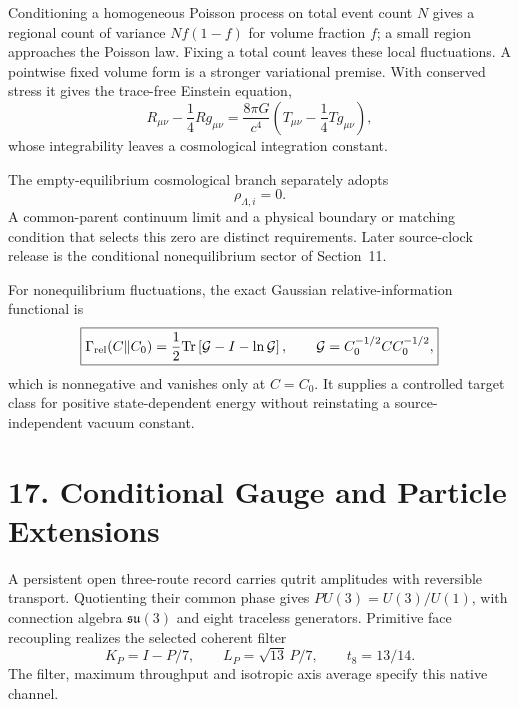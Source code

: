 \documentclass[11pt]{article}
\begin{document}
Conditioning a homogeneous Poisson process on total event count $N$ gives a regional count of variance $Nf(1-f)$ for volume fraction $f$; a small region approaches the Poisson law. Fixing a total count leaves these local fluctuations. A pointwise fixed volume form is a stronger variational premise. With conserved stress it gives the trace-free Einstein equation,
\[
R_{\mu\nu}-\frac14Rg_{\mu\nu}
=\frac{8\pi G}{c^4}\left(T_{\mu\nu}-\frac14Tg_{\mu\nu}\right),
\]
whose integrability leaves a cosmological integration constant.

The empty-equilibrium cosmological branch separately adopts
\[
\boxed{\rho_{\Lambda,i}=0}.
\]
A common-parent continuum limit and a physical boundary or matching condition that selects this zero are distinct requirements. Later source-clock release is the conditional nonequilibrium sector of Section~11.

For nonequilibrium fluctuations, the exact Gaussian relative-information functional is
\[
\boxed{
\Gamma_{\rm rel}(C\Vert C_0)
=\frac12\mathrm{Tr}\left[\mathcal G-I-\ln\mathcal G\right],
\qquad
\mathcal G=C_0^{-1/2}CC_0^{-1/2},
}
\]
which is nonnegative and vanishes only at $C=C_0$. It supplies a controlled target class for positive state-dependent energy without reinstating a source-independent vacuum constant.

\section{17. Conditional Gauge and Particle Extensions}

A persistent open three-route record carries qutrit amplitudes with
reversible transport. Quotienting their common phase gives
$PU(3)=U(3)/U(1)$, with connection algebra $\mathfrak{su}(3)$ and
eight traceless generators. Primitive face recoupling realizes the
selected coherent filter
\[
K_P=I-P/7,\qquad L_P=\sqrt{13}\,P/7,
\qquad t_8=13/14.
\]
The filter, maximum throughput and isotropic axis average specify this
native channel.
\end{document}
